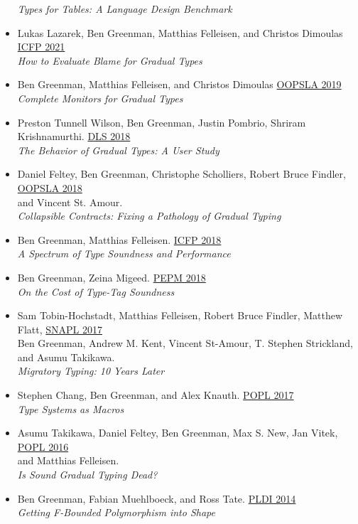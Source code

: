 \documentclass[11pt]{article}
\begin{document}
\begin{itemize}
  \emph{Types for Tables: A Language Design Benchmark}
\item
  Lukas Lazarek, Ben Greenman, Matthias Felleisen, and Christos Dimoulas \hfill \href{https://icfp21.sigplan.org/}{ICFP 2021} \\
  \emph{How to Evaluate Blame for Gradual Types}
\item
  Ben Greenman, Matthias Felleisen, and Christos Dimoulas \hfill \href{https://conf.researchr.org/track/splash-2019/splash-2019-OOPSLA}{OOPSLA 2019} \\
  \emph{Complete Monitors for Gradual Types}
\item
  Preston Tunnell Wilson, Ben Greenman, Justin Pombrio, Shriram Krishnamurthi. \hfill \href{https://conf.researchr.org/track/dls-2018/dls-2018}{DLS 2018} \\
  \emph{The Behavior of Gradual Types: A User Study}
\item
  Daniel Feltey, Ben Greenman, Christophe Scholliers, Robert Bruce Findler, \hfill \href{https://2018.splashcon.org/track/splash-2018-OOPSLA}{OOPSLA 2018} \\
  and Vincent St. Amour. \\
  \emph{Collapsible Contracts: Fixing a Pathology of Gradual Typing}
\item
  Ben Greenman, Matthias Felleisen. \hfill \href{https://icfp18.sigplan.org/}{ICFP 2018} \\
  \emph{A Spectrum of Type Soundness and Performance}
\item
  Ben Greenman, Zeina Migeed. \hfill \href{https://popl18.sigplan.org/track/PEPM-2018}{PEPM 2018} \\
  \emph{On the Cost of Type-Tag Soundness}
\item
  Sam Tobin-Hochstadt, Matthias Felleisen, Robert Bruce Findler, Matthew Flatt, \hfill \href{https://snapl.org/2017/}{SNAPL 2017} \\
  Ben Greenman, Andrew M. Kent, Vincent St-Amour, T. Stephen Strickland, \\
  and Asumu Takikawa. \\
  \emph{Migratory Typing: 10 Years Later}
\item
  Stephen Chang, Ben Greenman, and Alex Knauth. \hfill \href{https://popl17.sigplan.org/}{POPL 2017} \\
   \emph{Type Systems as Macros}
\item
  Asumu Takikawa, Daniel Feltey, Ben Greenman, Max S. New, Jan Vitek, \hfill \href{https://popl16.sigplan.org/}{POPL 2016} \\
   and Matthias Felleisen. \\
   \emph{Is Sound Gradual Typing Dead?}
\item
  Ben Greenman, Fabian Muehlboeck, and Ross Tate. \hfill \href{https://conferences.inf.ed.ac.uk/pldi2014/}{PLDI 2014} \\
  \emph{Getting F-Bounded Polymorphism into Shape}
\end{itemize}
\end{document}
